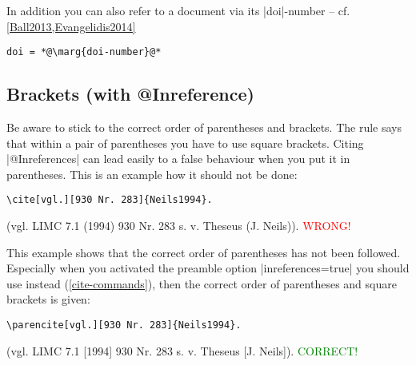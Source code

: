 \documentclass[a4paper,
10pt,
greek,
french,
spanish,
italian,
ngerman,
english
]{ltxdoc}
\begin{document}
 In addition you can also refer to a document via its |doi|-number -- cf. \cref{Ball2013,Evangelidis2014} 
\begin{lstlisting}
doi = *@\marg{doi-number}@*
\end{lstlisting}	

\subsection{Brackets (with @Inreference)}\label{faq:inreference}
Be aware to stick to the correct order of parentheses and brackets.
The rule says that within a pair of parentheses you have to use square brackets.
Citing |@Inreferences| can lead easily to a false behaviour when you put it in parentheses.
This is an example how it should not be done:
\begin{lstlisting}
\cite[vgl.][930 Nr. 283]{Neils1994}.
\end{lstlisting}
 \begin{bsp}
(vgl. LIMC 7.1 (1994) 930 Nr. 283 s. v. Theseus (J. Neils)). \textcolor{red}{WRONG!}
\end{bsp}
 
\DescribeMacro{\parencite} \DescribeMacro{\parencites}
This example shows that the correct order of parentheses has not been followed.
Especially when you activated the preamble option  |inreferences=true|  you should use  instead (\cref{cite-commands}), then the correct order of parentheses and square brackets is given:
\begin{lstlisting}
\parencite[vgl.][930 Nr. 283]{Neils1994}.
\end{lstlisting}

\begin{bsp} 
(vgl. LIMC 7.1 [1994] 930 Nr. 283 s. v. Theseus [J. Neils]). \textcolor{green}{CORRECT!}
\end{bsp}
\end{document}
